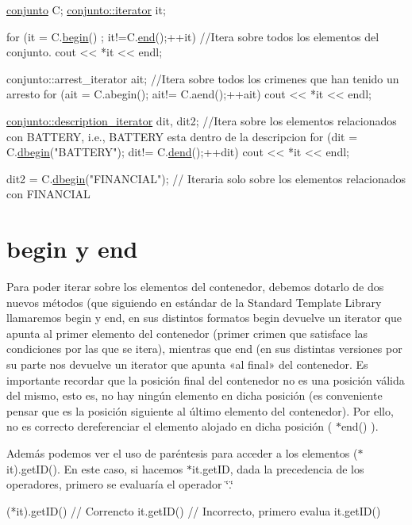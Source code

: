 \begin{DoxyCode}
\hyperlink{classconjunto}{conjunto} C;
\hyperlink{classconjunto_1_1iterator}{conjunto::iterator} it;

\textcolor{keywordflow}{for} (it = C.\hyperlink{classconjunto_af90b2324c2675dd4751a79f2e2ad8277}{begin}() ; it!=C.\hyperlink{classconjunto_adeef17ca21f1fb29f803790c89c1fc56}{end}();++it) \textcolor{comment}{//Itera sobre todos los elementos del conjunto.}
  cout << *it << endl;

conjunto::arrest\_iterator ait; \textcolor{comment}{//Itera sobre todos los crimenes que han tenido un arresto}
\textcolor{keywordflow}{for} (ait = C.abegin(); ait!= C.aend();++ait) 
  cout << *it << endl;


\hyperlink{classconjunto_1_1description__iterator}{conjunto::description\_iterator} dit, dit2;  \textcolor{comment}{//Itera sobre los elementos
       relacionados con BATTERY, i.e., BATTERY esta dentro de la descripcion}
\textcolor{keywordflow}{for} (dit = C.\hyperlink{classconjunto_ac40bafea5d9dc529c96cf0e5977100c6}{dbegin}(\textcolor{stringliteral}{"BATTERY"}); dit!= C.\hyperlink{classconjunto_aaff3013d49c52c4d3177168338725756}{dend}();++dit) 
  cout << *it << endl;

dit2 = C.\hyperlink{classconjunto_ac40bafea5d9dc529c96cf0e5977100c6}{dbegin}(\textcolor{stringliteral}{"FINANCIAL"});  \textcolor{comment}{// Iteraria solo sobre los elementos relacionados con FINANCIAL}
\end{DoxyCode}
\hypertarget{index_ini}{}\section{begin y end}\label{index_ini}
Para poder iterar sobre los elementos del contenedor, debemos dotarlo de dos nuevos métodos (que siguiendo en estándar de la Standard Template Library llamaremos begin y end, en sus distintos formatos begin devuelve un iterator que apunta al primer elemento del contenedor (primer crimen que satisface las condiciones por las que se itera), mientras que end (en sus distintas versiones por su parte nos devuelve un iterator que apunta «al final» del contenedor. Es importante recordar que la posición final del contenedor no es una posición válida del mismo, esto es, no hay ningún elemento en dicha posición (es conveniente pensar que es la posición siguiente al último elemento del contenedor). Por ello, no es correcto dereferenciar el elemento alojado en dicha posición ( $\ast$end() ).

Además podemos ver el uso de paréntesis para acceder a los elementos ($\ast$it).get\-I\-D(). En este caso, si hacemos $\ast$it.get\-I\-D, dada la precedencia de los operadores, primero se evaluaría el operador \char`\"{}.\char`\"{} 
\begin{DoxyCode}
(*it).getID() \textcolor{comment}{// Correncto}
 it.getID() \textcolor{comment}{// Incorrecto, primero evalua it.getID()}
\end{DoxyCode}


